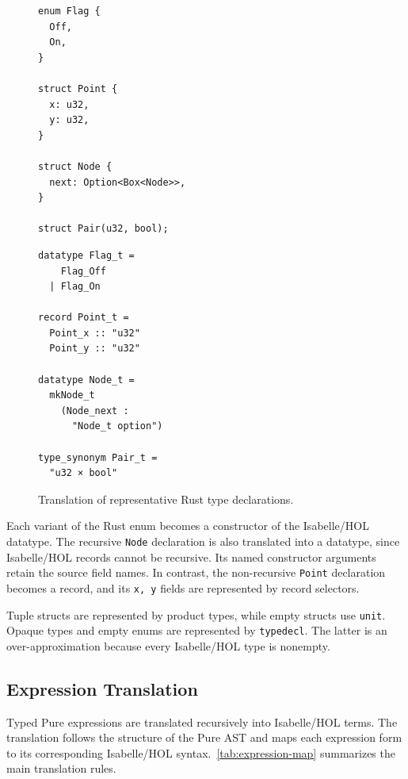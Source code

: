 \begin{figure}[!ht]
\centering
\begin{minipage}{0.88\linewidth}
\begin{minipage}[t]{0.36\textwidth}
\begin{verbatim}
enum Flag {
  Off,
  On,
}

struct Point {
  x: u32,
  y: u32,
}

struct Node {
  next: Option<Box<Node>>,
}

struct Pair(u32, bool);
\end{verbatim}
\end{minipage}
\hfill
\vrule{}
\hfill
\begin{minipage}[t]{0.44\textwidth}
\begin{verbatim}
datatype Flag_t =
    Flag_Off
  | Flag_On

record Point_t =
  Point_x :: "u32"
  Point_y :: "u32"

datatype Node_t =
  mkNode_t
    (Node_next :
      "Node_t option")

type_synonym Pair_t =
  "u32 × bool"
\end{verbatim}
\end{minipage}
\end{minipage}
\caption{Translation of representative Rust type declarations.}
\label{fig:type-declaration-example}
\end{figure}
Each variant of the Rust enum becomes a constructor of the Isabelle/HOL datatype.
The recursive \texttt{Node} declaration is also translated into a datatype, since Isabelle/HOL records cannot be recursive. Its named constructor arguments retain the source field names.
In contrast, the non-recursive \texttt{Point} declaration becomes a record, and its \texttt{x, y} fields are represented by record selectors.

Tuple structs are represented by product types, while empty structs use
\texttt{unit}.  Opaque types and empty enums are represented by
\texttt{typedecl}.  The latter is an over-approximation because every
Isabelle/HOL type is nonempty.

\subsection{Expression Translation}
\label{sec:expressions}

Typed Pure expressions are translated recursively into Isabelle/HOL terms.
The translation follows the structure of the Pure AST and maps each expression form to its corresponding Isabelle/HOL syntax.~\autoref{tab:expression-map} summarizes the main translation rules.

